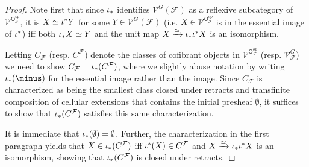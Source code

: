 \documentclass[a4paper,10pt]{article}%
\begin{document}
\begin{proof}
Note first that since $\iota_{\**}$ identifies 
$\mathcal{V}^{G}(\mathcal{F})$ as a reflexive 
subcategory of $\mathcal{V}^{\mathsf{O}_{\mathcal{F}}^{op}}$, 
it is 
$X \simeq \iota^{\**}Y$ for some 
$Y \in \mathcal{V}^{G}(\mathcal{F})$
(i.e. $X \in \mathcal{V}^{\mathsf{O}_{\mathcal{F}}^{op}}$
is in the essential image of $\iota^{\**}$)
iff both $\iota_{\**}X \simeq Y$ and the unit map 
$X \xrightarrow{\simeq} \iota_{\**} \iota^{\**}X$
is an isomorphism.

Letting $C_{\mathcal{F}}$ (resp. $C^{\mathcal{F}}$) denote the classes of cofibrant objects in 
$\mathcal{V}^{\mathsf{O}_{\mathcal{F}}^{op}}$ 
(resp. $\mathcal{V}^G_{\mathcal{F}}$)
we need to show 
$C_{\mathcal{F}} = \iota_{\**}(C^{\mathcal{F}})$,
where we slightly abuse notation by writing 
$\iota_{\**}(\minus)$ for the essential image rather than the image.
Since $C_{\mathcal{F}}$ is characterized as being the smallest class closed under retracts and transfinite composition of cellular extensions
that contains the initial presheaf $\emptyset$,
it suffices to show that 
$\iota_{\**}(C^{\mathcal{F}})$
satisfies this same characterization.

It is immediate that $\iota_{\**}(\emptyset) = \emptyset$.
Further, the characterization in the first paragraph yields that 
$X \in \iota_{\**}(C^{\mathcal{F}})$ iff $\iota^{\**}(X)\in C^{\mathcal{F}}$ and $X \xrightarrow{\simeq} \iota_{\**} \iota^{\**}X$ is an isomorphism, showing that  
$\iota_{\**}(C^{\mathcal{F}})$ is closed under retracts.


\end{proof}
\end{document}
